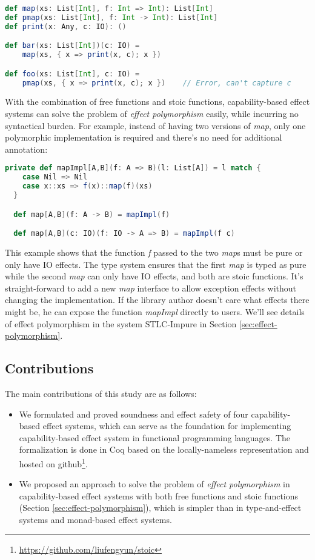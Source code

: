 \begin{lstlisting}[language=Scala]
def map(xs: List[Int], f: Int => Int): List[Int]
def pmap(xs: List[Int], f: Int -> Int): List[Int]
def print(x: Any, c: IO): ()

def bar(xs: List[Int])(c: IO) =
    map(xs, { x => print(x, c); x })

def foo(xs: List[Int], c: IO) =
    pmap(xs, { x => print(x, c); x })    // Error, can't capture c
\end{lstlisting}

With the combination of free functions and stoic functions,
capability-based effect systems can solve the problem of \emph{effect
  polymorphism} easily, while incurring no syntactical burden. For
example, instead of having two versions of \emph{map}, only one
polymorphic implementation is required and there's no need for
additional annotation:

\begin{lstlisting}[language=Scala]
  private def mapImpl[A,B](f: A => B)(l: List[A]) = l match {
    case Nil => Nil
    case x::xs => f(x)::map(f)(xs)
  }

  def map[A,B](f: A -> B) = mapImpl(f)

  def map[A,B](c: IO)(f: IO -> A => B) = mapImpl(f c)
\end{lstlisting}

This example shows that the function \emph{f} passed to the two
\emph{map}s must be pure or only have IO effects. The type system
ensures that the first \emph{map} is typed as pure while the second
\emph{map} can only have IO effects, and both are stoic
functions. It's straight-forward to add a new \emph{map} interface to
allow exception effects without changing the implementation. If the
library author doesn't care what effects there might be, he can expose
the function \emph{mapImpl} directly to users.  We'll see details of
effect polymorphism in the system STLC-Impure in Section
\ref{sec:effect-polymorphism}.

\subsection{Contributions}

The main contributions of this study are as follows:

\begin{itemize}
\item We formulated and proved soundness and effect safety of four
  capability-based effect systems, which can serve as the foundation
  for implementing capability-based effect system in functional
  programming languages. The formalization is done in Coq based on the
  locally-nameless representation\cite{chargueraud-11-ln} and hosted
  on github\footnote{\url{https://github.com/liufengyun/stoic}}.
\item We proposed an approach to solve the problem of \emph{effect
    polymorphism} in capability-based effect systems with both free
  functions and stoic functions (Section
  \ref{sec:effect-polymorphism}), which is simpler than in
  type-and-effect systems and monad-based effect systems.
\end{itemize}


